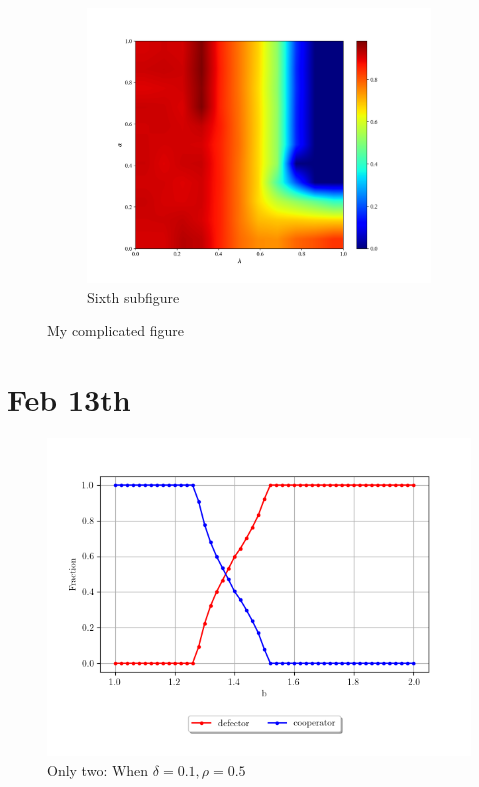 \documentclass{article}
\begin{document}
\begin{figure}[t!]
\begin{subfigure}{0.48\textwidth}
\includegraphics[width=\linewidth]{b015_0.png}
\caption{Sixth subfigure} \label{fig:f}
\end{subfigure}

\caption{My complicated figure} \label{fig:1}
\end{figure}

\clearpage

\section{Feb 13th}
\begin{figure}[h]
    \centering
    \includegraphics[width=\textwidth]{Only_two_b.png}
    \caption{Only two: When $\delta = 0.1, \rho = 0.5$}
    \label{fig:onlytwo}
\end{figure}




 
\end{document}

